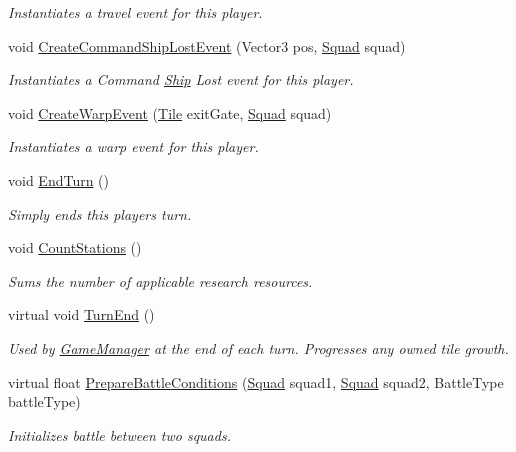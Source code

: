 \begin{DoxyCompactItemize}
\begin{DoxyCompactList}\small\item\em Instantiates a travel event for this player. \end{DoxyCompactList}\item 
void \hyperlink{class_player_a90de313e281a584573a62db7aac602d0}{Create\+Command\+Ship\+Lost\+Event} (Vector3 pos, \hyperlink{class_squad}{Squad} squad)
\begin{DoxyCompactList}\small\item\em Instantiates a Command \hyperlink{class_ship}{Ship} Lost event for this player. \end{DoxyCompactList}\item 
void \hyperlink{class_player_a842e0d3ac8f4b7d2b9421f7c0dc60a75}{Create\+Warp\+Event} (\hyperlink{class_tile}{Tile} exit\+Gate, \hyperlink{class_squad}{Squad} squad)
\begin{DoxyCompactList}\small\item\em Instantiates a warp event for this player. \end{DoxyCompactList}\item 
void \hyperlink{class_player_abb52796720f91baf5dbc678626bb0045}{End\+Turn} ()
\begin{DoxyCompactList}\small\item\em Simply ends this player\textquotesingle{}s turn. \end{DoxyCompactList}\item 
void \hyperlink{class_player_a14a3824a55beb9d6f95555bcbb50b90a}{Count\+Stations} ()
\begin{DoxyCompactList}\small\item\em Sums the number of applicable research resources. \end{DoxyCompactList}\item 
virtual void \hyperlink{class_player_a3705ecd22d3aeb4146d0081e1cbd4055}{Turn\+End} ()
\begin{DoxyCompactList}\small\item\em Used by \hyperlink{class_game_manager}{Game\+Manager} at the end of each turn. Progresses any owned tile growth. \end{DoxyCompactList}\item 
virtual float \hyperlink{class_player_a46b9f70ab158242937f4c7a8d97bdd73}{Prepare\+Battle\+Conditions} (\hyperlink{class_squad}{Squad} squad1, \hyperlink{class_squad}{Squad} squad2, Battle\+Type battle\+Type)
\begin{DoxyCompactList}\small\item\em Initializes battle between two squads. \end{DoxyCompactList}\item 

\end{DoxyCompactItemize}
